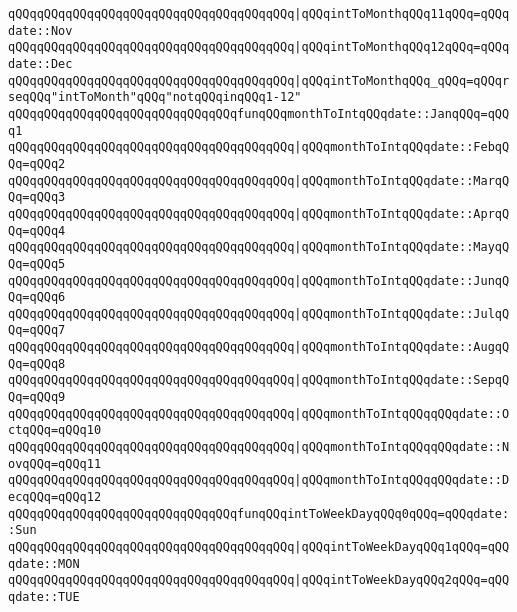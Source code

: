\verb|qQQqqQQqqQQqqQQqqQQqqQQqqQQqqQQqqQQqqQQq|\verb#|qQQqintToMonthqQQq11qQQq=qQQqdate::Nov#\newline
\verb|qQQqqQQqqQQqqQQqqQQqqQQqqQQqqQQqqQQqqQQq|\verb#|qQQqintToMonthqQQq12qQQq=qQQqdate::Dec#\newline
\verb|qQQqqQQqqQQqqQQqqQQqqQQqqQQqqQQqqQQqqQQq|\verb#|qQQqintToMonthqQQq_qQQq=qQQqrseqQQq"intToMonth"qQQq"notqQQqinqQQq1-12"#\newline
\newline
\verb|qQQqqQQqqQQqqQQqqQQqqQQqqQQqqQQqfunqQQqmonthToIntqQQqdate::JanqQQq=qQQq1|\newline
\verb|qQQqqQQqqQQqqQQqqQQqqQQqqQQqqQQqqQQqqQQq|\verb#|qQQqmonthToIntqQQqdate::FebqQQq=qQQq2#\newline
\verb|qQQqqQQqqQQqqQQqqQQqqQQqqQQqqQQqqQQqqQQq|\verb#|qQQqmonthToIntqQQqdate::MarqQQq=qQQq3#\newline
\verb|qQQqqQQqqQQqqQQqqQQqqQQqqQQqqQQqqQQqqQQq|\verb#|qQQqmonthToIntqQQqdate::AprqQQq=qQQq4#\newline
\verb|qQQqqQQqqQQqqQQqqQQqqQQqqQQqqQQqqQQqqQQq|\verb#|qQQqmonthToIntqQQqdate::MayqQQq=qQQq5#\newline
\verb|qQQqqQQqqQQqqQQqqQQqqQQqqQQqqQQqqQQqqQQq|\verb#|qQQqmonthToIntqQQqdate::JunqQQq=qQQq6#\newline
\verb|qQQqqQQqqQQqqQQqqQQqqQQqqQQqqQQqqQQqqQQq|\verb#|qQQqmonthToIntqQQqdate::JulqQQq=qQQq7#\newline
\verb|qQQqqQQqqQQqqQQqqQQqqQQqqQQqqQQqqQQqqQQq|\verb#|qQQqmonthToIntqQQqdate::AugqQQq=qQQq8#\newline
\verb|qQQqqQQqqQQqqQQqqQQqqQQqqQQqqQQqqQQqqQQq|\verb#|qQQqmonthToIntqQQqdate::SepqQQq=qQQq9#\newline
\verb|qQQqqQQqqQQqqQQqqQQqqQQqqQQqqQQqqQQqqQQq|\verb#|qQQqmonthToIntqQQqqQQqdate::OctqQQq=qQQq10#\newline
\verb|qQQqqQQqqQQqqQQqqQQqqQQqqQQqqQQqqQQqqQQq|\verb#|qQQqmonthToIntqQQqqQQqdate::NovqQQq=qQQq11#\newline
\verb|qQQqqQQqqQQqqQQqqQQqqQQqqQQqqQQqqQQqqQQq|\verb#|qQQqmonthToIntqQQqqQQqdate::DecqQQq=qQQq12#\newline
\newline
\verb|qQQqqQQqqQQqqQQqqQQqqQQqqQQqqQQqfunqQQqintToWeekDayqQQq0qQQq=qQQqdate::Sun|\newline
\verb|qQQqqQQqqQQqqQQqqQQqqQQqqQQqqQQqqQQqqQQq|\verb#|qQQqintToWeekDayqQQq1qQQq=qQQqdate::MON#\newline
\verb|qQQqqQQqqQQqqQQqqQQqqQQqqQQqqQQqqQQqqQQq|\verb#|qQQqintToWeekDayqQQq2qQQq=qQQqdate::TUE#\newline
